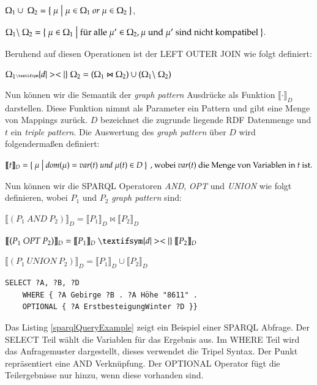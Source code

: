 \documentclass[draft,final]{vutinfth} %
\begin{document}
 $\Omega_1 \cup \ \Omega_2 = \Set{ \mu | \mu \in \Omega_1 \ or \ \mu \in \Omega_2 }$,

 $\Omega_1 \backslash \ \Omega_2 = \Set{ \mu \in \Omega_1 | \text{für alle} \ \mu' \in \Omega_2, \mu \ \text{und} \ \mu' \ \text{sind nicht kompatibel} }$.

Beruhend auf diesen Operationen ist der LEFT OUTER JOIN wie folgt definiert:

$\Omega_1 {\tiny \textifsym{d|><|}} \ \Omega_2 = (\Omega_1 \Join \Omega_2) \cup (\Omega_1 \backslash \ \Omega_2)$


Nun können wir die Semantik der \textit{graph pattern} Ausdrücke als Funktion $\llbracket \cdot \rrbracket_D$ darstellen. Diese Funktion nimmt als Parameter ein Pattern und gibt eine Menge von Mappings zurück. $D$ bezeichnet die zugrunde liegende RDF Datenmenge und $t$ ein \textit{triple pattern}. Die Auswertung des \textit{graph pattern} über $D$ wird folgenderma\ss en definiert:

$\llbracket t \rrbracket_D = \Set{ \mu | dom(\mu) = var(t) \ und \ \mu(t) \in D } \ \text{, wobei} \ var(t) \ \text{die Menge von Variablen in} \ t \ \text{ist.}$ 

Nun können wir die SPARQL Operatoren \textit{AND}, \textit{OPT} und \textit{UNION} wie folgt definieren, wobei $P_1$ und $P_2$ \textit{graph pattern} sind:

$\llbracket (P_1 \ AND \ P_2) \rrbracket_D = \llbracket P_1 \rrbracket_D \Join \llbracket P_2 \rrbracket_D$

$\llbracket (P_1 \ OPT \ P_2) \rrbracket_D = \llbracket P_1 \rrbracket_D \ \textifsym{d|><|} \ \llbracket P_2 \rrbracket_D$

$\llbracket (P_1 \ UNION \ P_2) \rrbracket_D = \llbracket P_1 \rrbracket_D \cup \llbracket P_2 \rrbracket_D$




\begin{lstlisting}[language=Sparql,caption={SPARQL Beispiel},frame = single,label={sparqlQueryExample}]
SELECT ?A, ?B, ?D
	WHERE { ?A Gebirge ?B . ?A Höhe "8611" . 
	OPTIONAL { ?A ErstbesteigungWinter ?D }}
\end{lstlisting}

Das Listing \ref{sparqlQueryExample} zeigt ein Beispiel einer SPARQL Abfrage. Der SELECT Teil wählt die Variablen für das Ergebnis aus. Im WHERE Teil wird das Anfragemuster dargestellt, dieses verwendet die Tripel Syntax. Der Punkt repräsentiert eine AND Verknüpfung. Der OPTIONAL Operator fügt die Teilergebnisse nur hinzu, wenn diese vorhanden sind.
\end{document}
